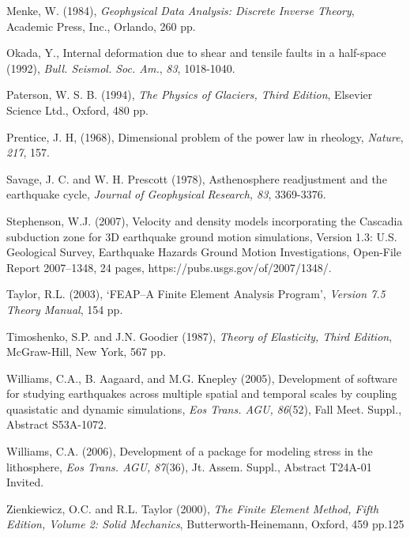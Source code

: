 \begin{thebibliography}{Bibliography}
Menke, W. (1984), \textit{Geophysical
  Data Analysis: Discrete Inverse Theory}, Academic Press, Inc.,
  Orlando, 260 pp.

Okada, Y., Internal deformation due
  to shear and tensile faults in a half-space (1992), \textit{Bull.
    Seismol. Soc. Am.}, \textit{83}, 1018-1040.

Paterson, W. S. B. (1994),
  \textit{The Physics of Glaciers, Third Edition}, Elsevier Science
  Ltd., Oxford, 480 pp.

Prentice, J. H, (1968),
  Dimensional problem of the power law in rheology, \textit{Nature},
  \textit{217}, 157.

Savage,
  J. C. and W. H. Prescott (1978), Asthenosphere readjustment and the
  earthquake cycle, \textit{Journal of Geophysical}
  \textit{Research}\emph{, 83}, 3369-3376.

Stephenson, W.J. (2007),
  Velocity and density models incorporating the Cascadia subduction
  zone for 3D earthquake ground motion simulations, Version 1.3:
  U.S. Geological Survey, Earthquake Hazards Ground Motion
  Investigations, Open-File Report 2007–1348, 24 pages,
  https://pubs.usgs.gov/of/2007/1348/.

Taylor, R.L. (2003), `FEAP--A
  Finite Element Analysis Program', \textit{Version 7.5 Theory
    Manual}, 154 pp.

Timoshenko, S.P. and J.N. Goodier
  (1987), \textit{Theory of Elasticity, Third Edition}, McGraw-Hill,
  New York, 567 pp.

Williams, C.A.,
  B. Aagaard, and M.G. Knepley (2005), Development of software for
  studying earthquakes across multiple spatial and temporal scales by
  coupling quasistatic and dynamic simulations, \emph{Eos Trans. AGU,
    86}(52), Fall Meet. Suppl., Abstract S53A-1072.

Williams, C.A. (2006),
  Development of a package for modeling stress in the lithosphere,
  \emph{Eos Trans.  AGU,} \emph{87}(36), Jt. Assem. Suppl., Abstract
  T24A-01 Invited.

Zienkiewicz, O.C. and R.L. Taylor
  (2000), \textit{The Finite Element Method, Fifth Edition, Volume 2:
  Solid Mechanics}, Butterworth-Heinemann, Oxford, 459 pp.125


\end{thebibliography}
